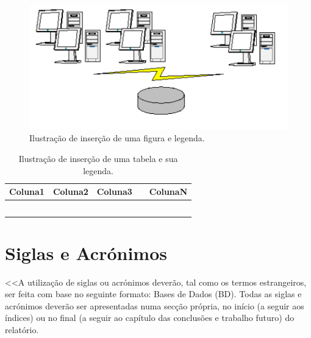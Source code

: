          \begin{figure}[!h]
            \centering
            \includegraphics[scale=0.7]{images/example.png}
            \caption{Ilustração de inserção de uma figura e legenda.}
         \end{figure}
        
        \vspace*{0.2cm}
        
        \begin{table}[!h]
            \centering
            \begin{tabular}{|p{2cm}|p{2cm}|p{2cm}|p{2cm}|p{2cm}|}
               \hline
               \rowcolor{gray!20!white}
                Coluna1 & Coluna2 & Coluna3 & & ColunaN \\
                \hline
                        &         &         & &         \\
                \hline
                        &         &         & &         \\
                \hline
                        &         &         & &         \\
                \hline
                        &         &         & &         \\
                \hline
                        &         &         & &         \\
                \hline
            \end{tabular}
            \caption{Ilustração de inserção de uma tabela e sua legenda.}
        \end{table}
        
        
    \section{Siglas e Acrónimos}
        <<A utilização de siglas ou acrónimos deverão, tal como os termos estrangeiros, ser feita com base no seguinte formato: Bases de Dados (BD). Todas as siglas e acrónimos deverão ser apresentadas numa secção própria, no início (a seguir aos índices) ou no final (a seguir ao capítulo das conclusões e trabalho futuro) do relatório.
